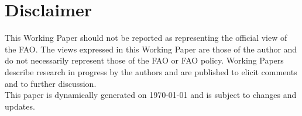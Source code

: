 \documentclass[nojss]{jss}\usepackage[]{graphicx}\usepackage[]{color}
\begin{document}
\section*{Disclaimer}
This Working Paper should not be reported as representing the official view of
the FAO. The views expressed in this Working Paper are those of the
author and do not necessarily represent those of the FAO or FAO
policy. Working Papers describe research in progress by the authors and
are published to elicit comments and to further discussion.\\

This paper is dynamically generated on \today{} and is subject to
changes and updates.
\end{document}
